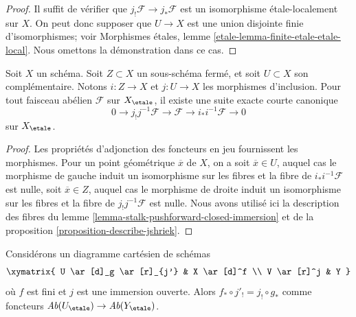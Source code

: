 \begin{proof}
Il suffit de vérifier que $j_!\mathcal{F} \to j_*\mathcal{F}$
est un isomorphisme étale-localement sur $X$.
On peut donc supposer que $U \to X$ est une union disjointe finie
d'isomorphismes; voir
Morphismes étales, lemme \ref{etale-lemma-finite-etale-etale-local}.
Nous omettons la démonstration dans ce cas.
\end{proof}

\begin{lemma}
\label{lemma-ses-associated-to-open}
Soit $X$ un schéma. Soit $Z \subset X$ un sous-schéma fermé, et soit
$U \subset X$ son complémentaire. Notons $i : Z \to X$ et $j : U \to X$
les morphismes d'inclusion. Pour tout faisceau abélien $\mathcal{F}$ sur $X_\etale$,
il existe une suite exacte courte canonique
$$
0 \to j_!j^{-1}\mathcal{F} \to \mathcal{F} \to i_*i^{-1}\mathcal{F} \to 0
$$
sur $X_\etale$.
\end{lemma}

\begin{proof}
Les propriétés d'adjonction des foncteurs en jeu fournissent les
morphismes. Pour un point géométrique $\overline{x}$ de $X$, on a soit
$\overline{x} \in U$, auquel cas le morphisme de gauche induit
un isomorphisme sur les fibres et la fibre de $i_*i^{-1}\mathcal{F}$
est nulle, soit $\overline{x} \in Z$, auquel cas le morphisme de droite induit
un isomorphisme sur les fibres et la fibre de $j_!j^{-1}\mathcal{F}$
est nulle. Nous avons utilisé ici la description des fibres du
lemme \ref{lemma-stalk-pushforward-closed-immersion} et de la
proposition \ref{proposition-describe-jshriek}.
\end{proof}

\begin{lemma}
\label{lemma-compatible-shriek-push-finite}
Considérons un diagramme cartésien de schémas
$$
\xymatrix{
U \ar[d]_g \ar[r]_{j'} & X \ar[d]^f \\
V \ar[r]^j & Y
}
$$
où $f$ est fini et $j$ est une immersion ouverte.
Alors $f_* \circ j'_! = j_! \circ g_*$ comme foncteurs
$\textit{Ab}(U_\etale) \to \textit{Ab}(Y_\etale)$.
\end{lemma}

